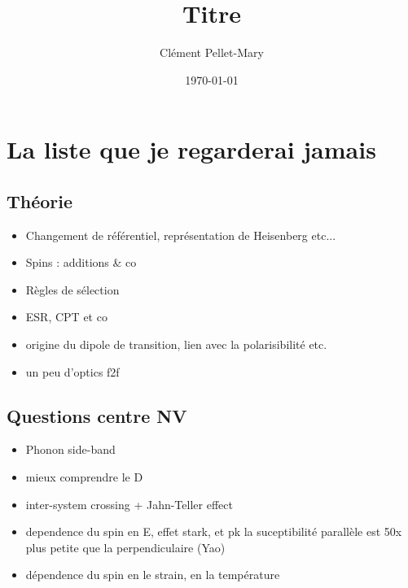 \documentclass[a4paper]{report}
\title{Titre}
\author{Clément Pellet-Mary}
\date\today
\begin{document}
\chapter{La liste que je regarderai jamais}
  \section{Théorie}
  \begin{itemize}
  \item Changement de référentiel, représentation de Heisenberg etc...
  \item Spins : additions \& co
  \item Règles de sélection
  \item ESR, CPT et co
  \item origine du dipole de transition, lien avec la polarisibilité etc.
  \item un peu d'optics f2f
  \end{itemize}
  \section{Questions centre NV}
  \begin{itemize}
  \item Phonon side-band
  \item mieux comprendre le D
  \item inter-system crossing + Jahn-Teller effect
  \item dependence du spin en E, effet stark, et pk la suceptibilité parallèle est 50x plus petite que la perpendiculaire (Yao)
  \item dépendence du spin en le strain, en la température
  \end{itemize}
 
\end{document}
